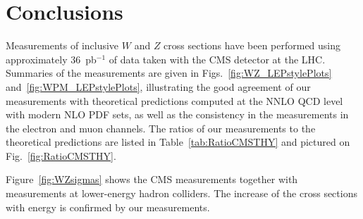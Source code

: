 \section{Conclusions\label{sec:conclusions}}

Measurements of inclusive $W$ and $Z$ cross sections have been
performed using approximately 36~pb$^{-1}$ of data taken with the 
CMS detector at the LHC. 
Summaries of the measurements are given 
in Figs.~\ref{fig:WZ_LEPstylePlots} and~\ref{fig:WPM_LEPstylePlots},
illustrating the good agreement of our measurements with theoretical
predictions computed at the NNLO QCD level with modern NLO PDF sets,
as well as the consistency in the measurements in the electron
and muon channels.  The ratios of our measurements to the theoretical
predictions are listed in Table~\ref{tab:RatioCMSTHY}
and pictured on Fig.~\ref{fig:RatioCMSTHY}.  
%
%
\par
Figure~\ref{fig:WZsigmas} shows the CMS measurements together 
with measurements at lower-energy hadron colliders.
The increase of the cross sections with energy is confirmed
by our measurements.

